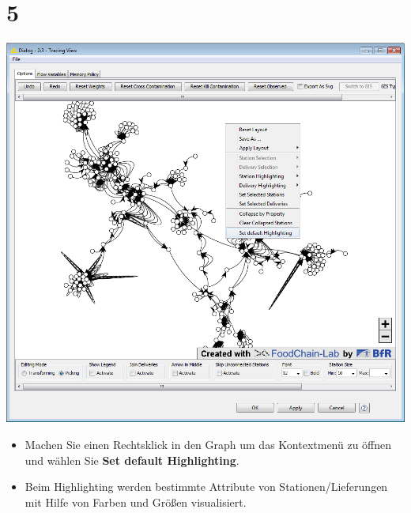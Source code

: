 \documentclass{beamer}
\begin{document}
\section{5}
\begin{frame}
	\begin{center}
  		\includegraphics[height=0.6\textheight]{5.png}
	\end{center}
	\begin{itemize}
		\item Machen Sie einen Rechtsklick in den Graph um das Kontextmenü zu öffnen und wählen Sie \textbf{Set default Highlighting}.
		\item Beim Highlighting werden bestimmte Attribute von Stationen/Lieferungen mit Hilfe von Farben und Größen visualisiert.
	\end{itemize}
\end{frame}
\end{document}
